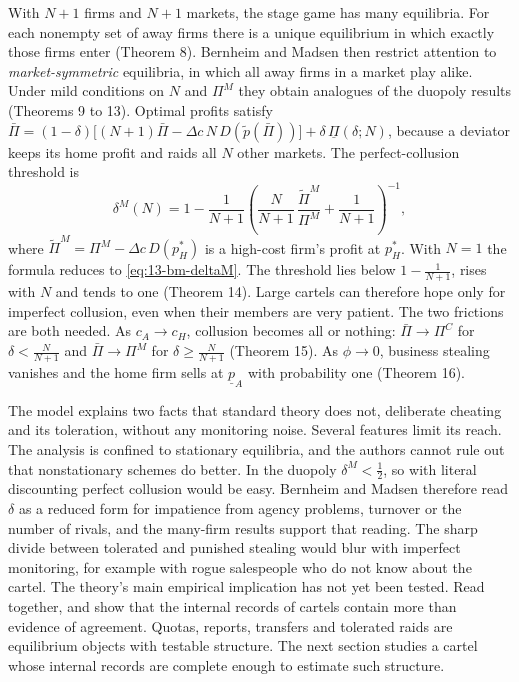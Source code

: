 With $N+1$ firms and $N+1$ markets, the stage game has many equilibria. For each nonempty set of away firms
there is a unique equilibrium in which exactly those firms enter (Theorem 8). Bernheim and Madsen then restrict
attention to \emph{market-symmetric} equilibria, in which all away firms in a market play alike. Under mild
conditions on $N$ and $\Pi^M$ they obtain analogues of the duopoly results (Theorems 9 to 13). Optimal profits
satisfy
$\bar\Pi=(1-\delta)\bigl[(N+1)\bar\Pi-\Delta c\,N\,D(\tilde p(\bar\Pi))\bigr]+\delta\,\underline\Pi(\delta;N)$,
because a deviator keeps its home profit and raids all $N$ other markets. The perfect-collusion threshold is
\[
\delta^M(N)=1-\frac{1}{N+1}\left(\frac{N}{N+1}\,\frac{\tilde\Pi^M}{\Pi^M}+\frac{1}{N+1}\right)^{-1},
\]
where $\tilde\Pi^M=\Pi^M-\Delta c\,D(p_H^*)$ is a high-cost firm's profit at $p_H^*$. With $N=1$ the formula
reduces to \eqref{eq:13-bm-deltaM}. The threshold lies below $1-\frac{1}{N+1}$, rises with $N$ and tends to one
(Theorem 14). Large cartels can therefore hope only for imperfect collusion, even when their members are very
patient. The two frictions are both needed. As $c_A\to c_H$, collusion becomes all or nothing: $\bar\Pi\to\Pi^C$
for $\delta<\frac{N}{N+1}$ and $\bar\Pi\to\Pi^M$ for $\delta\ge\frac{N}{N+1}$ (Theorem 15). As $\phi\to0$,
business stealing vanishes and the home firm sells at $\underline p_A$ with probability one (Theorem 16).

The model explains two facts that standard theory does not, deliberate cheating and its toleration, without
any monitoring noise. Several features limit its reach. The analysis is confined to stationary equilibria,
and the authors cannot rule out that nonstationary schemes do better. In the duopoly $\delta^M<\frac{1}{2}$, so
with literal discounting perfect collusion would be easy. Bernheim and Madsen therefore read $\delta$ as a
reduced form for impatience from agency problems, turnover or the number of rivals, and the many-firm results
support that reading. The sharp divide between tolerated and punished stealing would blur with imperfect
monitoring, for example with rogue salespeople who do not know about the cartel. The theory's main empirical
implication has not yet been tested. Read together, \citet{HarringtonSkrzypacz2011} and
\citet{BernheimMadsen2017} show that the internal records of cartels contain more than evidence of agreement.
Quotas, reports, transfers and tolerated raids are equilibrium objects with testable structure. The next
section studies a cartel whose internal records are complete enough to estimate such structure.

